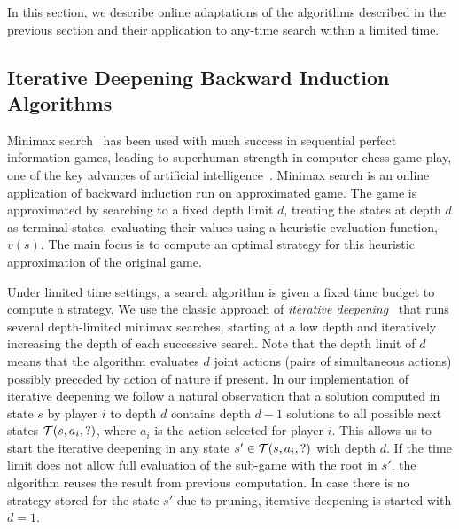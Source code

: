 In this section, we describe online adaptations of the algorithms described in the previous section and their application 
to any-time search within a limited time. 

\subsection{Iterative Deepening Backward Induction Algorithms} \label{sec:idbi}

Minimax search~\cite{AIbook} has been used with much success in sequential perfect information games, 
leading to superhuman strength in computer chess game play, one of the key advances of artificial 
intelligence~\cite{Campbell02deepblue}. 
Minimax search is an online application of backward induction run on approximated game. 
The game is approximated by searching to a fixed depth limit $d$, treating the states at depth $d$
as terminal states, evaluating their values using a heuristic evaluation function, $v(s)$. 
The main focus is to compute an optimal strategy for this heuristic approximation of the original game. 

Under limited time settings, a search algorithm is given a fixed time budget to compute a strategy. 
We use the classic approach of {\it iterative deepening}~\cite{AIbook} that runs several depth-limited 
minimax searches, starting at a low depth and iteratively increasing the depth of each successive search. 
Note that the depth limit of $d$ means that the algorithm evaluates $d$ joint actions (\ie pairs of simultaneous actions) possibly preceded by action of nature if present.  
In our implementation of iterative deepening we follow a natural observation that a solution computed in state $s$ by player $i$ to depth $d$ contains depth $d-1$ solutions to all possible next states $\mathcal{T}(s,a_i,?)$, where $a_i$ is the action selected for player $i$.
This allows us to start the iterative deepening in any state $s' \in \mathcal{T}(s,a_i,?)$ with depth $d$.
If the time limit does not allow full evaluation of the sub-game with the root in $s'$, the algorithm reuses the result from previous computation.
In case there is no strategy stored for the state $s'$ due to pruning, iterative deepening is started with $d = 1$.

